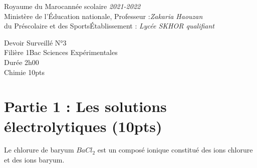\documentclass[12pt]{article}
\newcommand\headerMe[2]{\noindent{}#1\hfill#2}
\begin{document}
\headerMe{Royaume du Maroc}{année scolaire \emph{2021-2022}}\\
\headerMe{Ministère de l'Éducation nationale, }{  Professeur :\emph{Zakaria Haouzan}}\\
\headerMe{du Préscolaire et des Sports}{Établissement : \emph{Lycée SKHOR qualifiant}}\\

\begin{center}
Devoir Surveillé  N°3 \\
    Filière 1Bac Sciences Expérimentales\\
Durée 2h00
\\
    \vspace{.2cm}
\hrulefill
\Large{Chimie 10pts}
\hrulefill\\

\end{center}

 \section*{Partie 1 : Les solutions électrolytiques \dotfill(10pts) }

Le chlorure de baryum $BaCl_2$ est un composé ionique constitué des ions chlorure et des ions baryum.
\end{document}
